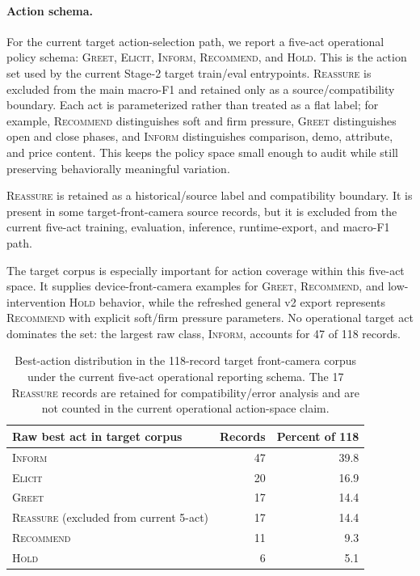\paragraph{Action schema.}
For the current target action-selection path, we report a five-act operational policy schema: \textsc{Greet}, \textsc{Elicit}, \textsc{Inform}, \textsc{Recommend}, and \textsc{Hold}. This is the action set used by the current Stage-2 target train/eval entrypoints. \textsc{Reassure} is excluded from the main macro-F1 and retained only as a source/compatibility boundary. Each act is parameterized rather than treated as a flat label; for example, \textsc{Recommend} distinguishes soft and firm pressure, \textsc{Greet} distinguishes open and close phases, and \textsc{Inform} distinguishes comparison, demo, attribute, and price content. This keeps the policy space small enough to audit while still preserving behaviorally meaningful variation.

\textsc{Reassure} is retained as a historical/source label and compatibility boundary. It is present in some target-front-camera source records, but it is excluded from the current five-act training, evaluation, inference, runtime-export, and macro-F1 path.

The target corpus is especially important for action coverage within this five-act space. It supplies device-front-camera examples for \textsc{Greet}, \textsc{Recommend}, and low-intervention \textsc{Hold} behavior, while the refreshed general v2 export represents \textsc{Recommend} with explicit soft/firm pressure parameters. No operational target act dominates the set: the largest raw class, \textsc{Inform}, accounts for 47 of 118 records.

\begin{table}[t]
\centering
\small
\begin{tabular}{lrr}
\toprule
Raw best act in target corpus & Records & Percent of 118 \\
\midrule
\textsc{Inform} & 47 & 39.8 \\
\textsc{Elicit} & 20 & 16.9 \\
\textsc{Greet} & 17 & 14.4 \\
\textsc{Reassure} (excluded from current 5-act) & 17 & 14.4 \\
\textsc{Recommend} & 11 & 9.3 \\
\textsc{Hold} & 6 & 5.1 \\
\bottomrule
\end{tabular}
\caption{Best-action distribution in the 118-record target front-camera corpus under the current five-act operational reporting schema. The 17 \textsc{Reassure} records are retained for compatibility/error analysis and are not counted in the current operational action-space claim.}
\label{tab:target-actions}
\end{table}

